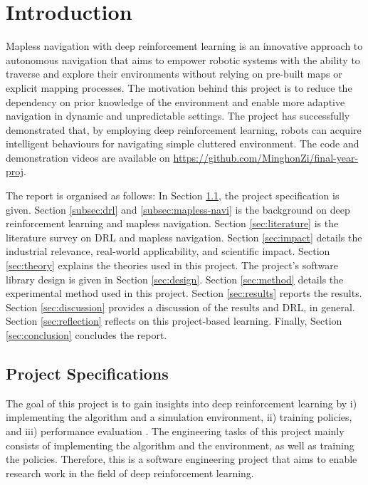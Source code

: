 \newpage
\section{Introduction}

Mapless navigation with deep reinforcement learning is an innovative approach to autonomous navigation that aims to empower robotic systems with the ability to traverse and explore their environments without relying on pre-built maps or explicit mapping processes. The motivation behind this project is to reduce the dependency on prior knowledge of the environment and enable more adaptive navigation in dynamic and unpredictable settings. The project has successfully demonstrated that, by employing deep reinforcement learning, robots can acquire intelligent behaviours for navigating simple cluttered environment. The code and demonstration videos are available on \url{https://github.com/MinghonZi/final-year-proj}.

The report is organised as follows: 
In Section \ref{subsec:spec}, the project specification is given.
Section \ref{subsec:drl} and \ref{subsec:mapless-navi} is the background on deep reinforcement learning and mapless navigation.
Section \ref{sec:literature} is the literature survey on DRL and mapless navigation.
Section \ref{sec:impact} details the industrial relevance, real-world applicability, and scientific impact.
Section \ref{sec:theory} explains the theories used in this project.
The project's software library design is given in Section \ref{sec:design}.
Section \ref{sec:method} details the experimental method used in this project.
Section \ref{sec:results} reports the results.
Section \ref{sec:discussion} provides a discussion of the results and DRL, in general.
Section \ref{sec:reflection} reflects on this project-based learning.
Finally, Section \ref{sec:conclusion} concludes the report.



\subsection{Project Specifications} \label{subsec:spec}

The goal of this project is to gain insights into deep reinforcement learning by i) implementing the algorithm and a simulation environment, ii) training policies, and iii) performance evaluation \cite{ref:spec-report}. The engineering tasks of this project mainly consists of implementing the algorithm and the environment, as well as training the policies. Therefore, this is a software engineering project that aims to enable research work in the field of deep reinforcement learning.

